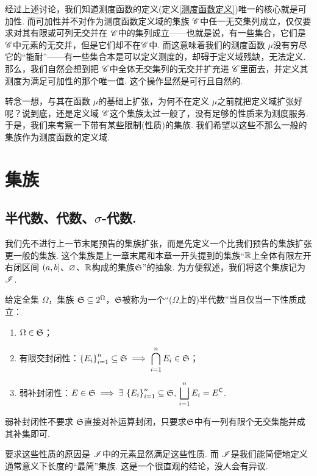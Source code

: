 经过上述讨论，我们知道测度函数的定义(定义\ref{测度函数定义})唯一的核心就是可加性. 而可加性并不对作为测度函数定义域的集族 $\mathscr{C}$中任一无交集列成立，仅仅要求对其有限或可列无交并在 $\mathscr{C}$中的集列成立——也就是说，有一些集合，它们是$\mathscr{C}$中元素的无交并，但是它们却不在$\mathscr{C}$中. 而这意味着我们的测度函数 $\mu$没有穷尽它的“能耐”——有一些集合本是可以定义测度的，却碍于定义域残缺，无法定义. 那么，我们自然会想到把 $\mathscr{C}$中全体无交集列的无交并扩充进 $\mathscr{C}$里面去，并定义其测度为满足可加性的那个唯一值. 这个操作显然是可行且自然的.

转念一想，与其在函数 $\mu$的基础上扩张，为何不在定义 $\mu$之前就把定义域扩张好呢？说到底，还是定义域 $\mathscr{C}$这个集族太过一般了，没有足够的性质来为测度服务. 于是，我们来考察一下带有某些限制(性质)的集族. 我们希望以这些不那么一般的集族作为测度函数的定义域.


\section{集族}
\subsection{半代数、代数、$\sigma$-代数.}
我们先不进行上一节末尾预告的集族扩张，而是先定义一个比我们预告的集族扩张更一般的集族. 这个集族是上一章末尾和本章一开头提到的集族“$\mathbb{R}$上全体有限左开右闭区间 $\left(a,b\right]$、$\varnothing$、$\mathbb{R}$构成的集族${\mathfrak{S}}$”的抽象. 为方便叙述，我们将这个集族记为 $\mathscr{I}$.
\begin{definition}[半代数]
    给定全集 $\Omega$，集族 ${\mathfrak{S}}\subseteq2^{\Omega}$，${\mathfrak{S}}$被称为一个“($\Omega$上的)半代数”当且仅当一下性质成立：
    \begin{enumerate}
        \item $\Omega\in{\mathfrak{S}}$；
        \item 有限交封闭性：$\displaystyle \left\{ E_i \right\}_{i=1}^n\subseteq{\mathfrak{S}}\implies \bigcap_{i=1}^n E_i \in{\mathfrak{S}}$；
        \item 弱补封闭性：$\displaystyle E\in{\mathfrak{S}}\implies\exists\,\left\{ E_i \right\}_{i=1}^n\subseteq{\mathfrak{S}},\,\bigsqcup_{i=1}^n E_i=E^{\mathsf{C}}$.
    \end{enumerate}
\end{definition}
\begin{remark}
    弱补封闭性不要求 ${\mathfrak{S}}$直接对补运算封闭，只要求${\mathfrak{S}}$中有一列有限个无交集能并成其补集即可.
\end{remark}
\begin{remark}
    要求这些性质的原因是 $\mathscr{I}$中的元素显然满足这些性质. 而 $\mathscr{I}$是我们能简便地定义通常意义下长度的“最简”集族. 这是一个很直观的结论，没人会有异议.
\end{remark}
\vspace{0.5cm}

